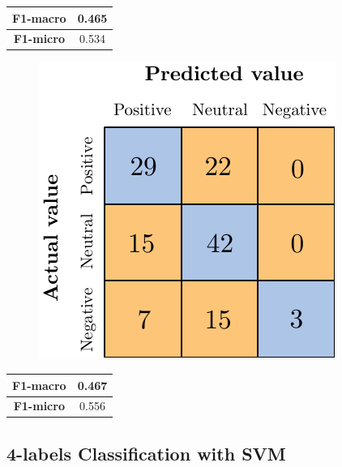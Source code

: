 \begin{center}
	\begin{tabular}{ | c | c | } 
		\hline
		\textbf{F1-macro} & 0.465 \\
		\hline
		\textbf{F1-micro} & 0.534 \\ 
		\hline
	\end{tabular}
\end{center}


\begin{figure}[H]
	\centering
	\includegraphics[scale=1]{figures/conf_matrices/ita_snt_bpef/ita_snt_bpef_afs.pdf}
	\label{fig:ita_snt_bpef_afs}
\end{figure}

\begin{center}
	\begin{tabular}{ | c | c | } 
		\hline
		\textbf{F1-macro} & 0.467 \\
		\hline
		\textbf{F1-micro} & 0.556 \\ 
		\hline
	\end{tabular}
\end{center}

\subsection{4-labels Classification with SVM}

